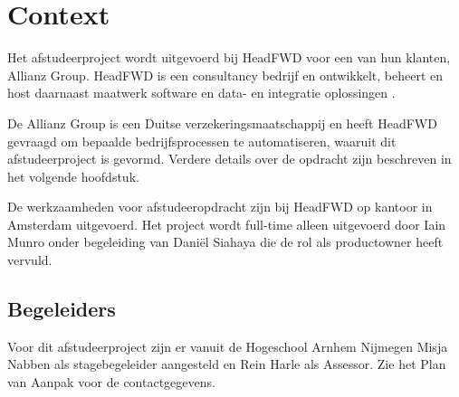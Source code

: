 \chapter{Context}
Het afstudeerproject wordt uitgevoerd bij HeadFWD voor een van hun klanten, Allianz Group. HeadFWD is een consultancy bedrijf en ontwikkelt, beheert en host daarnaast maatwerk software en data- en integratie oplossingen \cite{pva}. 
\par
De Allianz Group is een Duitse verzekeringsmaatschappij\cite{pva} en heeft HeadFWD gevraagd om bepaalde bedrijfsprocessen te automatiseren, waaruit dit afstudeerproject is gevormd. Verdere details over de opdracht zijn beschreven in het volgende hoofdstuk. 
\par
De werkzaamheden voor afstudeeropdracht zijn bij HeadFWD op kantoor in Amsterdam uitgevoerd. Het project wordt full-time alleen uitgevoerd door Iain Munro onder begeleiding van Daniël Siahaya die de rol als productowner heeft vervuld.

\section{Begeleiders}
Voor dit afstudeerproject zijn er vanuit de Hogeschool Arnhem Nijmegen Misja Nabben als stagebegeleider aangesteld en Rein Harle als Assessor. Zie het Plan van Aanpak \cite{pva} voor de contactgegevens.